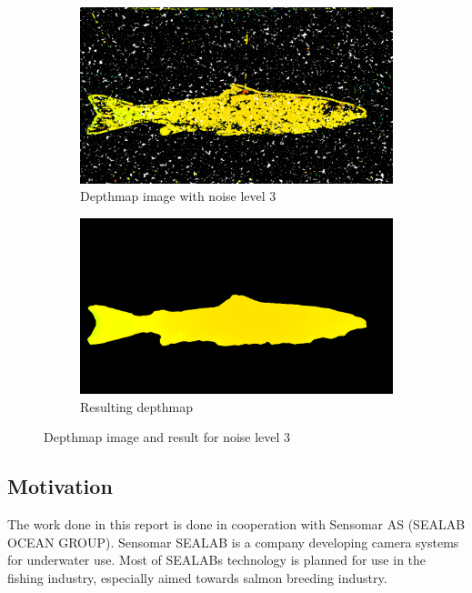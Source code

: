 \begin{figure}[h]
    \centering
    \begin{subfigure}{1\textwidth}
        \centering
        \includegraphics[width=.7\linewidth]{images/implementation/noise_level_3/1_original}
        \caption{Depthmap image with noise level 3} 
        \label{fig:noise_level_3_original}
    \end{subfigure}\hspace*{\fill}
    
    \medskip
    \begin{subfigure}{1\textwidth}
        \centering
        \includegraphics[width=.7\linewidth]{images/implementation/noise_level_3/7_median_filter}
        \caption{Resulting depthmap} 
        \label{fig:noise_level_3_result}
    \end{subfigure}\hspace*{\fill}
    \caption{Depthmap image and result for noise level 3}
    \label{fig:noise_level_3}
\end{figure}






\subsection{Motivation}

The work done in this report is done in cooperation with Sensomar AS (SEALAB OCEAN GROUP).
Sensomar SEALAB is a company developing camera systems for underwater use. Most of SEALABs technology is planned for use in the fishing industry, especially aimed towards salmon breeding industry. 

